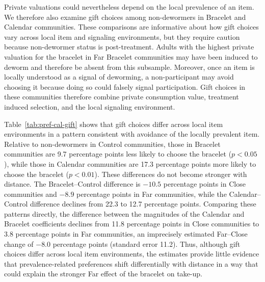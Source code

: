 \documentclass[ECM\space ReStud.tex]{subfiles}
\begin{document}
Private valuations could nevertheless depend on the local prevalence of an item. We therefore also examine gift choices among non-dewormers in Bracelet and Calendar communities. These comparisons are informative about how gift choices vary across local item and signaling environments, but they require caution because non-dewormer status is post-treatment. Adults with the highest private valuation for the bracelet in Far Bracelet communities may have been induced to deworm and therefore be absent from this subsample. Moreover, once an item is locally understood as a signal of deworming, a non-participant may avoid choosing it because doing so could falsely signal participation. Gift choices in these communities therefore combine private consumption value, treatment induced selection, and the local signaling environment.


Table~\ref{tab:pref-cal-gift} shows that gift choices differ across local item environments in a pattern consistent with avoidance of the locally prevalent item. Relative to non-dewormers in Control communities, those in Bracelet communities are 9.7 percentage points less likely to choose the bracelet (\(p<0.05\)), while those in Calendar communities are 17.3 percentage points more likely to choose the bracelet (\(p<0.01\)). These differences do not become stronger with distance. The Bracelet--Control difference is \(-10.5\) percentage points in Close communities and \(-8.9\) percentage points in Far communities, while the Calendar--Control difference declines from 22.3 to 12.7 percentage points. Comparing these patterns directly, the difference between the magnitudes of the Calendar and Bracelet coefficients declines from 11.8 percentage points in Close communities to 3.8 percentage points in Far communities, an imprecisely estimated Far--Close change of \(-8.0\) percentage points (standard error 11.2). Thus, although gift choices differ across local item environments, the estimates provide little evidence that prevalence-related preferences shift differentially with distance in a way that could explain the stronger Far effect of the bracelet on take-up.
\end{document}
